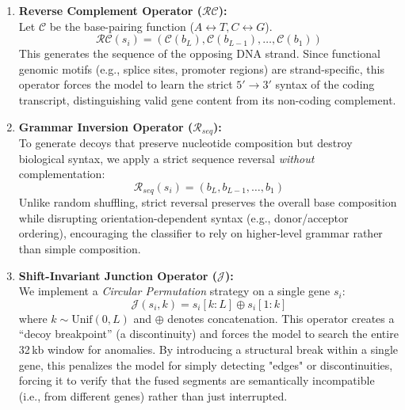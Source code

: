 \documentclass{bioinfo}
\begin{document}
\begin{enumerate}
    \item \textbf{Reverse Complement Operator ($\mathcal{RC}$):}\\
    Let $\mathcal{C}$ be the base-pairing function ($A \leftrightarrow T, C \leftrightarrow G$).
    \begin{equation}
        \mathcal{RC}(s_i) = (\mathcal{C}(b_L), \mathcal{C}(b_{L-1}), \dots, \mathcal{C}(b_1))
    \end{equation}
    This generates the sequence of the opposing DNA strand.  Since functional genomic motifs (e.g., splice sites, promoter regions) are strand-specific, this operator forces the model to learn the strict $5' \to 3'$ syntax of the coding transcript, distinguishing valid gene content from its non-coding complement.

    \item \textbf{Grammar Inversion Operator ($\mathcal{R}_{seq}$):}\\
    To generate decoys that preserve nucleotide composition but destroy biological syntax, we apply a strict sequence reversal \textit{without} complementation:
    \begin{equation}
        \mathcal{R}_{seq}(s_i) = (b_L, b_{L-1}, \dots, b_1)
    \end{equation}
    Unlike random shuffling, strict reversal preserves the overall base composition while disrupting orientation-dependent syntax (e.g., donor/acceptor ordering), encouraging the classifier to rely on higher-level grammar rather than simple composition.

    \item \textbf{Shift-Invariant Junction Operator ($\mathcal{J}$):}\\
    We implement a \textit{Circular Permutation} strategy on a single gene $s_i$:
    \begin{equation}
        \mathcal{J}(s_i, k) = s_i[k:L] \oplus s_i[1:k]
    \end{equation}
    where $k \sim \text{Unif}(0, L)$ and $\oplus$ denotes concatenation. This operator creates a ``decoy breakpoint'' (a discontinuity) and forces the model to search the entire 32\,kb window for anomalies. By introducing a structural break within a single gene, this penalizes the model for simply detecting "edges" or discontinuities, forcing it to verify that the fused segments are semantically incompatible (i.e., from different genes) rather than just interrupted.
\end{enumerate}
\end{document}
